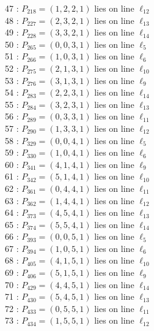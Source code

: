 \documentclass{article}
\begin{document}
{\begin{multicols}{2}
47 : $P_{218}=( 1, 2, 2, 1 )$ lies on line $\ell_{12}$\\
48 : $P_{227}=( 2, 3, 2, 1 )$ lies on line $\ell_{13}$\\
49 : $P_{228}=( 3, 3, 2, 1 )$ lies on line $\ell_{14}$\\
50 : $P_{265}=( 0, 0, 3, 1 )$ lies on line $\ell_{5}$\\
51 : $P_{266}=( 1, 0, 3, 1 )$ lies on line $\ell_{6}$\\
52 : $P_{275}=( 2, 1, 3, 1 )$ lies on line $\ell_{10}$\\
53 : $P_{276}=( 3, 1, 3, 1 )$ lies on line $\ell_{9}$\\
54 : $P_{283}=( 2, 2, 3, 1 )$ lies on line $\ell_{14}$\\
55 : $P_{284}=( 3, 2, 3, 1 )$ lies on line $\ell_{13}$\\
56 : $P_{289}=( 0, 3, 3, 1 )$ lies on line $\ell_{11}$\\
57 : $P_{290}=( 1, 3, 3, 1 )$ lies on line $\ell_{12}$\\
58 : $P_{329}=( 0, 0, 4, 1 )$ lies on line $\ell_{5}$\\
59 : $P_{330}=( 1, 0, 4, 1 )$ lies on line $\ell_{6}$\\
60 : $P_{341}=( 4, 1, 4, 1 )$ lies on line $\ell_{9}$\\
61 : $P_{342}=( 5, 1, 4, 1 )$ lies on line $\ell_{10}$\\
62 : $P_{361}=( 0, 4, 4, 1 )$ lies on line $\ell_{11}$\\
63 : $P_{362}=( 1, 4, 4, 1 )$ lies on line $\ell_{12}$\\
64 : $P_{373}=( 4, 5, 4, 1 )$ lies on line $\ell_{13}$\\
65 : $P_{374}=( 5, 5, 4, 1 )$ lies on line $\ell_{14}$\\
66 : $P_{393}=( 0, 0, 5, 1 )$ lies on line $\ell_{5}$\\
67 : $P_{394}=( 1, 0, 5, 1 )$ lies on line $\ell_{6}$\\
68 : $P_{405}=( 4, 1, 5, 1 )$ lies on line $\ell_{10}$\\
69 : $P_{406}=( 5, 1, 5, 1 )$ lies on line $\ell_{9}$\\
70 : $P_{429}=( 4, 4, 5, 1 )$ lies on line $\ell_{14}$\\
71 : $P_{430}=( 5, 4, 5, 1 )$ lies on line $\ell_{13}$\\
72 : $P_{433}=( 0, 5, 5, 1 )$ lies on line $\ell_{11}$\\
73 : $P_{434}=( 1, 5, 5, 1 )$ lies on line $\ell_{12}$\\

\end{multicols}}
\end{document}
